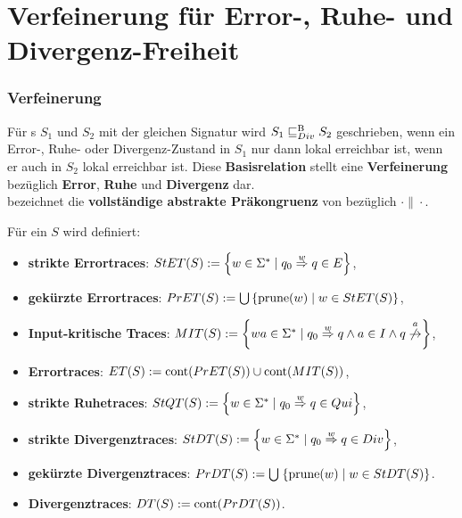 \section{Verfeinerung für Error-, Ruhe- und Divergenz-Freiheit}
\begin{frame}
  \frametitle{Verfeinerung}
  \begin{Def}
    Für \EIO{}s $S_1$ und $S_2$ mit der gleichen Signatur wird $S_1\sqsubseteq _{Div}^\mathrm{B} S_2$
    geschrieben, wenn ein Error-, Ruhe- oder Divergenz-Zustand in $S_1$ nur
    dann lokal erreichbar ist, wenn er auch in $S_2$ lokal erreichbar ist. Diese
    \textbf{Basisrelation} stellt eine \textbf{Verfeinerung} bezüglich \textbf{Error},
    \textbf{Ruhe} und \textbf{Divergenz} dar.\\
    \DCRel{} bezeichnet die \textbf{vollständige abstrakte Präkongruenz} von \DBRel{}
    bezüglich $\cdot\|\cdot$.
  \end{Def}
\end{frame}

\begin{frame}
  \begin{Def}[Traces]
    Für ein \EIO{} $S$ wird definiert:
    \begin{itemize}
      \item \textbf{strikte Errortraces}: $StET{}(S):=\left\{w\in\Sigma
        ^*\mid q_0\overset{w}{\Rightarrow}q\in E\right\}$,
      \item \textbf{gekürzte Errortraces}: $PrET{}(S):=\bigcup\left\{\mathrm{prune}{}(w)\mid w\in
        StET{}(S)\right\}$,
      \item \textbf{Input-kritische Traces}: $\MIT{}(S):=\left\{wa\in\Sigma ^*\mid
        q_0\overset{w}{\Rightarrow}q\wedge a\in I\wedge
      q\overset{a}{\not{\hspace{-0.1cm}\rightarrow}}\right\}$,
      \item \textbf{Errortraces}: $ET{}(S):=\mathrm{cont}{}(PrET{}(S))\cup
        \mathrm{cont}{}(MIT{}(S))$,
      \item \textbf{strikte Ruhetraces}: $StQT{}(S) := \left\{w\in\Sigma ^*\mid q_0
        \overset{w}{\Rightarrow} q\in Qui\right\}$,
      \item \textbf{strikte Divergenztraces}: $StDT{}(S) := \left\{w\in\Sigma
          ^*\mid
        q_0 \overset{w}{\Rightarrow} q\in Div\right\}$,
      \item \textbf{gekürzte Divergenztraces}: $PrDT{}(S) :=
        \bigcup\hspace{1pt}\left\{\mathrm{prune}{}(w)\mid w\in StDT{}(S)\right\}$.
      \item \textbf{Divergenztraces}: $DT{}(S) :=
        \mathrm{cont}{}(PrDT{}(S))$.
    \end{itemize}
  \end{Def}
\end{frame}

